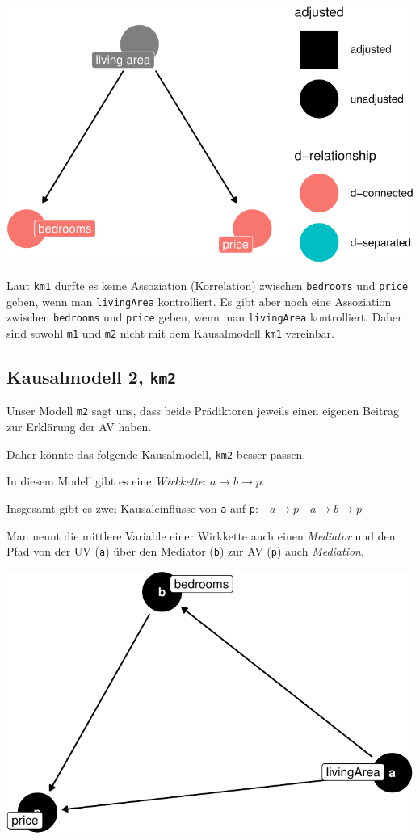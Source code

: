 \documentclass[
  a4paper,
  DIV=11]{scrreprt}
\theoremstyle{definition}
\theoremstyle{remark}
\begin{document}
\includegraphics{./kausal_files/figure-pdf/print-km1-1.pdf}

Laut \texttt{km1} dürfte es keine Assoziation (Korrelation) zwischen
\texttt{bedrooms} und \texttt{price} geben, wenn man \texttt{livingArea}
kontrolliert. Es gibt aber noch eine Assoziation zwischen
\texttt{bedrooms} und \texttt{price} geben, wenn man \texttt{livingArea}
kontrolliert. Daher sind sowohl \texttt{m1} und \texttt{m2} nicht mit
dem Kausalmodell \texttt{km1} vereinbar.

\hypertarget{kausalmodell-2-km2}{%
\subsection{\texorpdfstring{Kausalmodell 2,
\texttt{km2}}{Kausalmodell 2, km2}}\label{kausalmodell-2-km2}}

Unser Modell \texttt{m2} sagt uns, dass beide Prädiktoren jeweils einen
eigenen Beitrag zur Erklärung der AV haben.

Daher könnte das folgende Kausalmodell, \texttt{km2} besser passen.

In diesem Modell gibt es eine \emph{Wirkkette}:
\(a \rightarrow b \rightarrow p\).

Insgesamt gibt es zwei Kausaleinflüsse von \texttt{a} auf \texttt{p}: -
\(a \rightarrow p\) - \(a \rightarrow b \rightarrow p\)

Man nennt die mittlere Variable einer Wirkkette auch einen
\emph{Mediator} und den Pfad von der UV (\texttt{a}) über den Mediator
(\texttt{b}) zur AV (\texttt{p}) auch \emph{Mediation}.

\includegraphics{./kausal_files/figure-pdf/km2-1.pdf}
\end{document}
